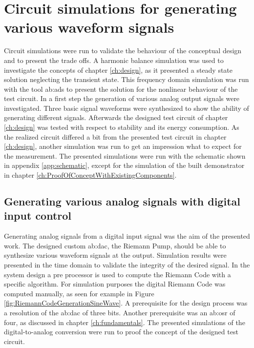 \chapter{Circuit simulations for generating various waveform signals}
Circuit simulations were run to validate the behaviour of the conceptual design and to present the trade offs.
A harmonic balance simulation was used to investigate the concepts of chapter \ref{ch:design}, as it presented a steady state solution neglecting the transient state.
This frequency domain simulation was run with the tool \gls{ab:ads} to present the solution for the nonlinear behaviour of the test circuit.
In a first step the generation of various analog output signals were investigated.
Three basic signal waveforms were synthesized to show the ability of generating different signals.
Afterwards the designed test circuit of chapter \ref{ch:design} was tested with respect to stability and its energy consumption.
As the realized circuit differed a bit from the presented test circuit in chapter \ref{ch:design}, another simulation was run to get an impression what to expect for the measurement.
The presented simulations were run with the schematic shown in appendix \ref{app:schematic}, except for the simulation of the built demonstrator in chapter \ref{ch:ProofOfConceptWithExistingComponents}.

\section{Generating various analog signals with digital input control}
Generating analog signals from a digital input signal was the aim of the presented work.
The designed custom \gls{ab:dac}, the Riemann Pump, should be able to synthesize various waveform signals at the output.
Simulation results were presented in the time domain to validate the integrity of the desired signal.
In the system design a pre processor is used to compute the Riemann Code with a specific algorithm.
For simulation purposes the digital Riemann Code was computed manually, as seen for example in Figure \ref{fig:RiemannCodeGenerationSineWave}.
A prerequisite for the design process was a resolution of the \gls{ab:dac} of three bits.
Another prerequisite was an \gls{ab:osr} of four, as discussed in chapter \ref{ch:fundamentals}.
The presented simulations of the digital-to-analog conversion were run to proof the concept of the designed test circuit.
 
